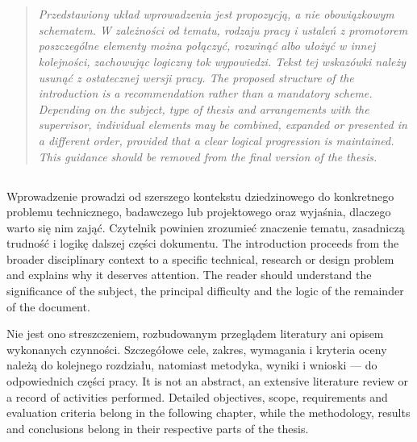 \chapter{}
\label{chap:wprowadzenie}


\begin{quote}
\itshape
\ploren
  {Przedstawiony układ wprowadzenia jest propozycją, a nie obowiązkowym schematem. W zależności od tematu, rodzaju pracy i ustaleń z promotorem poszczególne elementy można połączyć, rozwinąć albo ułożyć w innej kolejności, zachowując logiczny tok wypowiedzi. Tekst tej wskazówki należy usunąć z ostatecznej wersji pracy.}
  {The proposed structure of the introduction is a recommendation rather than a mandatory scheme. Depending on the subject, type of thesis and arrangements with the supervisor, individual elements may be combined, expanded or presented in a different order, provided that a clear logical progression is maintained. This guidance should be removed from the final version of the thesis.}
\end{quote}

\section{}

\ploren
  {Wprowadzenie prowadzi od szerszego kontekstu dziedzinowego do konkretnego problemu technicznego, badawczego lub projektowego oraz wyjaśnia, dlaczego warto się nim zająć. Czytelnik powinien zrozumieć znaczenie tematu, zasadniczą trudność i logikę dalszej części dokumentu.}
  {The introduction proceeds from the broader disciplinary context to a specific technical, research or design problem and explains why it deserves attention. The reader should understand the significance of the subject, the principal difficulty and the logic of the remainder of the document.}

\ploren
  {Nie jest ono streszczeniem, rozbudowanym przeglądem literatury ani opisem wykonanych czynności. Szczegółowe cele, zakres, wymagania i kryteria oceny należą do kolejnego rozdziału, natomiast metodyka, wyniki i wnioski — do odpowiednich części pracy.}
  {It is not an abstract, an extensive literature review or a record of activities performed. Detailed objectives, scope, requirements and evaluation criteria belong in the following chapter, while the methodology, results and conclusions belong in their respective parts of the thesis.}

